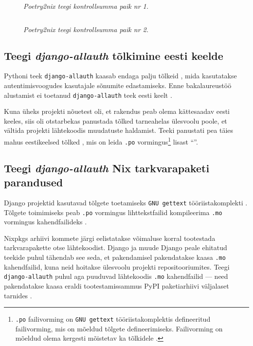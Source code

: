\begin{figure}
\inputminted[breaklines]{diff}{chapters/data/poetry2nix-patch1.diff}
\caption{\emph{Poetry2nix teegi kontrollsumma paik nr 1.}}\label{fig:poetry2nix-patch1}
\end{figure}

\begin{figure}
\inputminted[breaklines]{diff}{chapters/data/poetry2nix-patch2.diff}
\caption{\emph{Poetry2nix teegi kontrollsumma paik nr 2.}}\label{fig:poetry2nix-patch2}
\end{figure}
\clearpage

\subsection{Teegi \textit{django-allauth} tõlkimine eesti keelde}

Pythoni teek \texttt{django-allauth} kaasab endaga palju tõlkeid \cite{django-allauth-i18n}, mida kasutatakse autentimisvoogudes kasutajale sõnumite edastamiseks. Enne bakalaureustöö alustamist ei toetanud \texttt{django-allauth} teek eesti keelt \cite{django-allauth-pre-et-i18n}.

Kuna üheks projekti nõuetest oli, et rakendus peab olema kättesaadav eesti keeles, siis oli otstarbekas panustada tõlked tarneahelas ülesvoolu poole, et vältida projekti lähtekoodis muudatuste haldamist. Teeki panustati pea täies mahus eestikeelsed tõlked \cite{django-allauth-et-i18n-pr}, mis on leida \texttt{.po} vormingus\footnote{\texttt{.po} failivorming on \texttt{GNU gettext} tööriistakomplektis defineeritud failivorming, mis on mõeldud tõlgete defineerimiseks. Failivorming on mõeldud olema kergesti mõistetav ka tõlkidele \cite{gnu-gettext-po}.} lisast ``''.

\subsection{Teegi \textit{django-allauth} Nix tarkvarapaketi parandused}\label{subsec:compile-mo}

Django projektid kasutavad tõlgete toetamiseks \texttt{GNU gettext} tööriistakomplekti \cite{django-gettext}. Tõlgete toimimiseks peab \texttt{.po} vormingus lihttekstfailid kompileerima \texttt{.mo} vormingus kahendfailideks \cite{django-gettext}.

Nixpkgs arhiivi kommete järgi eelistatakse võimaluse korral tootestada tarkvarapakette otse lähtekoodist. Django ja muude Django peale ehitatud teekide puhul tähendab see seda, et pakendamisel pakendatakse kaasa \texttt{.mo} kahendfailid, kuna neid hoitakse ülesvoolu projekti repositooriumites. Teegi \texttt{django-allauth} puhul aga puuduvad lähtekoodis \texttt{.mo} kahendfailid — need pakendatakse kaasa eraldi tootestamissammus PyPI paketiarhiivi väljalaset tarnides \cite{django-allauth-no-mo-files}.

